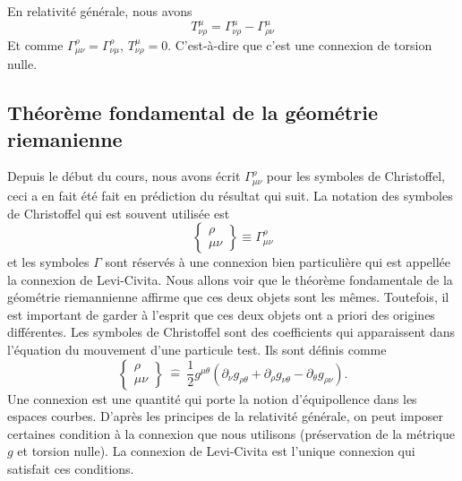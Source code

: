 \documentclass[a4paper,11pt]{report}
\theoremstyle{definition}
\theoremstyle{plain}
\theoremstyle{definition}
\theoremstyle{remark}
\newcommand{\p}{\partial}
\newcommand{\chris}[3]{\begin{Bmatrix}#1\\#2#3\end{Bmatrix}}
\begin{document}
            
                En relativité générale, nous avons
                \begin{equation}
                    T^\mu_{\nu\rho} = \Gamma^\mu_{\nu\rho} - \Gamma^\mu_{\rho\nu}
                \end{equation}
                Et comme $\Gamma^\rho_{\mu\nu} = \Gamma^\rho_{\nu\mu}$, $T^\mu_{\nu\rho} = 0$. C'est-à-dire que c'est une connexion de torsion nulle.
                
            \subsection{Théorème fondamental de la géométrie riemanienne}
            
                Depuis le début du cours, nous avons écrit $\Gamma^\rho_{\mu\nu}$ pour les symboles de Christoffel, ceci  a en fait été fait en prédiction du résultat qui suit. La notation des symboles de Christoffel qui est souvent utilisée est
                \begin{equation*}
                    \chris{\rho}{\mu}{\nu}\equiv
                    \Gamma^\rho_{\mu\nu}
                \end{equation*}
                et les symboles $\Gamma$ sont réservés à une connexion bien particulière qui est appellée la connexion de Levi-Civita. Nous allons voir que le théorème fondamentale de la géométrie riemannienne affirme que ces deux objets sont les mêmes. Toutefois, il est important de garder à l'esprit que ces deux objets ont a priori des origines différentes. Les symboles de Christoffel sont des coefficients qui apparaissent dans l'équation du mouvement d'une particule test. Ils sont définis comme
                \begin{equation}
                    \chris{\rho}{\mu}{\nu}~\hat{=}~
                    \frac{1}{2}g^{\mu\theta}\left( \p_\nu g_{\rho\theta}+\p_\rho g_{\nu\theta}-\p_\theta g_{\rho\nu} \right).
                \end{equation}
                Une connexion est une quantité qui porte la notion d'équipollence dans les espaces courbes. D'après les principes de la relativité générale, on peut imposer certaines condition à la connexion que nous utilisons (préservation de la métrique $g$ et torsion nulle). La connexion de Levi-Civita est l'unique connexion qui satisfait ces conditions.\\
            
\end{document}
